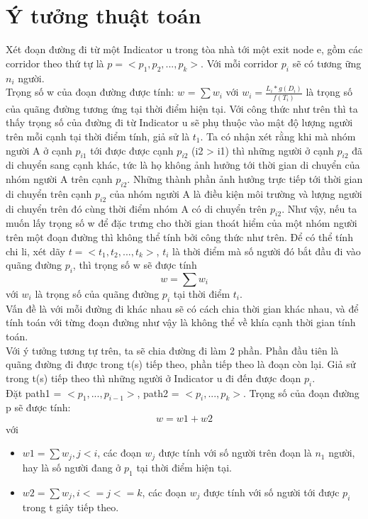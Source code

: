 \documentclass{article}
\begin{document}
    \section{Ý tưởng thuật toán}
    Xét đoạn đường đi từ một Indicator u trong tòa nhà tới một exit 
    node e, gồm các corridor theo thứ tự là $p = <p_{1}, p_{2}, ...,p_{k}
    >$. Với mỗi corridor $p_{i}$ sẽ có tương ững $n_{i}$ người. \\ 
    Trọng số w của đoạn đường được tính: $w$ = $\sum{w_{i}}$ với 
    $w_{i} = \frac{L_{i}*g(D_{i})}{f(T_{i})}$ là trọng số của quãng 
    đường tương ứng tại thời điểm hiện tại. Với công thức như trên 
    thì ta thấy trọng số của đường đi từ Indicator u sẽ phụ thuộc vào mật độ lượng
    người trên mỗi cạnh tại thời điểm tính, giả sử là $t_{1}$.
    Ta có nhận xét rằng khi mà nhóm người A ở cạnh $p_{i1}$ tới 
    được được cạnh $p_{i2}$ (i2 > i1) thì những người ở cạnh 
    $p_{i2}$ đã di chuyển sang cạnh khác, tức là họ không ảnh hưởng 
    tới thời gian di chuyển của nhóm người A trên cạnh $p_{i2}$. Những 
    thành phần ảnh hưởng trực tiếp tới thời gian di chuyển trên cạnh 
    $p_{i2}$ của nhóm người A là điều kiện môi trường và lượng người 
    di chuyển trên đó cùng thời điểm nhóm A có di chuyển trên $p_{i2}$. 
    Như vậy, nếu ta muốn 
    lấy trọng số w để đặc trưng cho thời gian thoát hiểm của một
    nhóm người trên một đoạn đường thì không thể tính bởi công thức 
    như trên. Để có thể tính chi li, xét dãy $t = <t_{1}, t_{2},
    ..., t_{k}>$, $t_{i}$ là thời điểm mà số người đó bắt đầu đi vào
    quãng đường $p_{i}$, thì trọng số w sẽ được tính 
    \begin{equation}
        w = \sum{w_{i}}
    \end{equation}  
    với $w_{i}$ là trọng số của quãng đường $p_{i}$ tại thời điểm 
    $t_{i}$. \\
    Vấn đề là với mỗi đường đi khác nhau sẽ có cách chia thời gian 
    khác nhau, và để tính toán với từng đoạn đường như vậy là không 
    thể về khía cạnh thời gian tính toán. \\ 
    Với ý tưởng tương tự trên, ta sẽ chia đường đi làm 2 phần. 
    Phần đầu tiên là quãng đường đi được trong t(s) tiếp theo, 
    phần tiếp theo là đoạn còn lại. Giả sử trong t(s) tiếp theo 
    thì những người ở Indicator u đi đến được đoạn $p_{i}$. \\
    Đặt path1 = $<p_{1}, ..., p_{i-1}>$, path2 = $<p_{i}, ..., p_{k}
    >$. Trọng số của đoạn đường p sẽ được tính: 
    \begin{equation}
        w = w1 + w2 
    \end{equation}
    với \begin{itemize}
        \item $w1 = \sum{w_{j}}, j < i$, các đoạn $w_{j}$ được
        tính với số người trên đoạn là $n_{1}$ người, hay là số 
        người đang ở $p_{1}$ tại thời điểm hiện tại.
        \item $w2 = \sum{w_{j}}, i <= j <= k$, các đoạn $w_{j}$
        được tính với số người tới được $p_{i}$ trong t giây 
        tiếp theo.
    \end{itemize}
\end{document}
